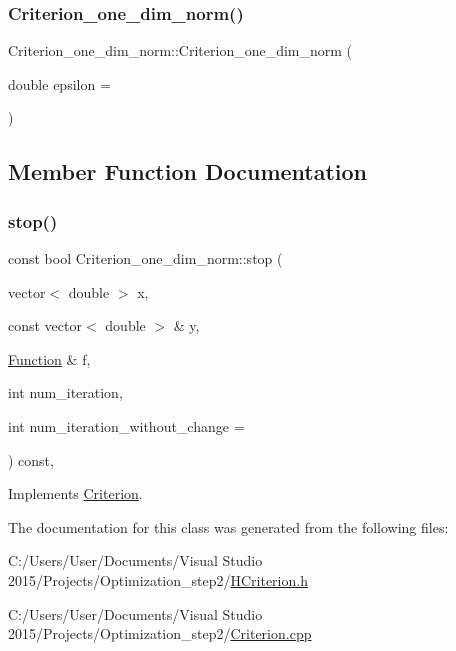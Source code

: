 \subsubsection{\texorpdfstring{Criterion\+\_\+one\+\_\+dim\+\_\+norm()}{Criterion\_one\_dim\_norm()}}
{\footnotesize\ttfamily Criterion\+\_\+one\+\_\+dim\+\_\+norm\+::\+Criterion\+\_\+one\+\_\+dim\+\_\+norm (\begin{DoxyParamCaption}\item[{double}]{epsilon = {} }\end{DoxyParamCaption})\hspace{0.3cm}{\ttfamily [inline]}}



\subsection{Member Function Documentation}
\mbox{\label{class_criterion__one__dim__norm_a7270d8ca17d8f810b4a270ad604be8bd}} 
\subsubsection{\texorpdfstring{stop()}{stop()}}
{\footnotesize\ttfamily const bool Criterion\+\_\+one\+\_\+dim\+\_\+norm\+::stop (\begin{DoxyParamCaption}\item[{vector$<$ double $>$}]{x,  }\item[{const vector$<$ double $>$ \&}]{y,  }\item[{\hyperlink{class_function}{Function} \&}]{f,  }\item[{int}]{num\+\_\+iteration,  }\item[{int}]{num\+\_\+iteration\+\_\+without\+\_\+change = {} }\end{DoxyParamCaption}) const\hspace{0.3cm}{\ttfamily [override]}, {\ttfamily [virtual]}}



Implements \hyperlink{class_criterion_aee3e2148c665c72c50c2f870a3ca8cdc}{Criterion}.



The documentation for this class was generated from the following files\+:\begin{DoxyCompactItemize}
\item 
C\+:/\+Users/\+User/\+Documents/\+Visual Studio 2015/\+Projects/\+Optimization\+\_\+step2/\hyperlink{_h_criterion_8h}{H\+Criterion.\+h}\item 
C\+:/\+Users/\+User/\+Documents/\+Visual Studio 2015/\+Projects/\+Optimization\+\_\+step2/\hyperlink{_criterion_8cpp}{Criterion.\+cpp}\end{DoxyCompactItemize}
